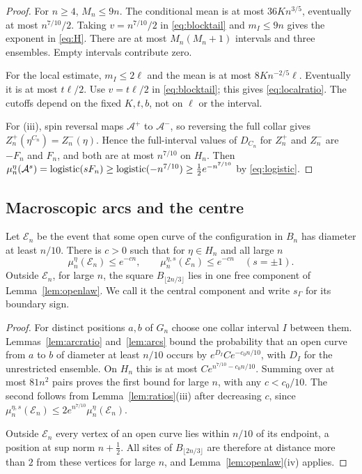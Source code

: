 \begin{proof}
For $n\ge4$, $M_n\le9n$. The conditional mean is at most $36Kn^{3/5}$, eventually at most $n^{7/10}/2$. Taking $v=n^{7/10}/2$ in \eqref{eq:blocktail} and $m_I\le9n$ gives the exponent in \eqref{eq:H}. There are at most $M_n(M_n+1)$ intervals and three ensembles. Empty intervals contribute zero.

For the local estimate, $m_I\le2\ell$ and the mean is at most $8Kn^{-2/5}\ell$. Eventually it is at most $t\ell/2$. Use $v=t\ell/2$ in \eqref{eq:blocktail}; this gives \eqref{eq:localratio}. The cutoffs depend on the fixed $K,t,b$, not on $\ell$ or the interval.

For (iii), spin reversal maps $\mathcal A^+$ to $\mathcal A^-$, so reversing the full collar gives $Z_n^+(\eta^{C_n})=Z_n^-(\eta)$. Hence the full-interval values of $D_{C_n}$ for $Z_n^+$ and $Z_n^-$ are $-F_n$ and $F_n$, and both are at most $n^{7/10}$ on $H_n$. Then $\mu_n^\eta(\mathcal A^s)=\operatorname{logistic}(sF_n)\ge\operatorname{logistic}(-n^{7/10})\ge\tfrac12e^{-n^{7/10}}$ by \eqref{eq:logistic}.
\end{proof}

\subsection{Macroscopic arcs and the centre}
\begin{lemma}\label{lem:long}
Let $\mathcal E_n$ be the event that some open curve of the configuration in $B_n$ has diameter at least $n/10$. There is $c>0$ such that for $\eta\in H_n$ and all large $n$
\begin{equation}\label{eq:long}
 \mu_n^\eta(\mathcal E_n)\le e^{-cn},\qquad
 \mu_n^{\eta,s}(\mathcal E_n)\le e^{-cn}\quad(s=\pm1).
\end{equation}
Outside $\mathcal E_n$, for large $n$, the square $B_{\lfloor2n/3\rfloor}$ lies in one free component of Lemma~\ref{lem:openlaw}. We call it the central component and write $s_\Gamma$ for its boundary sign.
\end{lemma}
\begin{proof}
For distinct positions $a,b$ of $G_n$ choose one collar interval $I$ between them. Lemmas~\ref{lem:arcratio} and~\ref{lem:arcs} bound the probability that an open curve from $a$ to $b$ of diameter at least $n/10$ occurs by $e^{D_I}Ce^{-c_0n/10}$, with $D_I$ for the unrestricted ensemble. On $H_n$ this is at most $Ce^{n^{7/10}-c_0n/10}$. Summing over at most $81n^2$ pairs proves the first bound for large $n$, with any $c<c_0/10$. The second follows from Lemma~\ref{lem:ratios}(iii) after decreasing $c$, since $\mu_n^{\eta,s}(\mathcal E_n)\le2e^{n^{7/10}}\mu_n^\eta(\mathcal E_n)$.

Outside $\mathcal E_n$ every vertex of an open curve lies within $n/10$ of its endpoint, a position at sup norm $n+\tfrac12$. All sites of $B_{\lfloor2n/3\rfloor}$ are therefore at distance more than $2$ from these vertices for large $n$, and Lemma~\ref{lem:openlaw}(iv) applies.
\end{proof}

